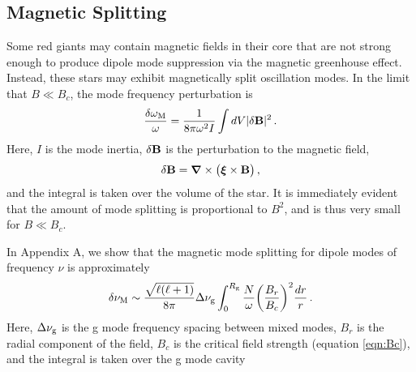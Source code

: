\subsection{Magnetic Splitting}

Some red giants may contain magnetic fields in their core that are not strong enough to produce dipole mode suppression via the magnetic greenhouse effect. Instead, these stars may exhibit magnetically split oscillation modes. In the limit that $B \ll B_c$, the mode frequency perturbation is \citep{Unno_1989}
\begin{equation}
\label{eqn:dommag}
\frac{\delta \omega_{\rm M}}{\omega} = \frac{1}{8 \pi \omega^2 I} \int d V | \delta {\bf B} |^2 \, .
\end{equation}
Here, $I$ is the mode inertia,  $\delta {\bf B}$ is the perturbation to the magnetic field,
\begin{equation}
\label{eqn:dB}
\delta {\bf B} = {\boldsymbol \nabla} \times \big( {\boldsymbol \xi} \times {\bf B} \big) \, ,
\end{equation}
and the integral is taken over the volume of the star. It is immediately evident that the amount of mode splitting is proportional to $B^2$, and is thus very small for $B \ll B_c$.

In Appendix A, we show that the magnetic mode splitting for dipole modes of frequency $\nu$ is approximately
\begin{equation}
\label{eqn:dfmag}
\delta \nu_{\rm M} \sim \frac{\sqrt{\ell(\ell+1)}}{8 \pi} \Delta \nu_{\rm g} \int^{R_{\rm g}}_0 \frac{N}{\omega} \bigg(\frac{B_r}{B_c}\bigg)^2 \frac{dr}{r} \, .
\end{equation}
Here, $\Delta \nu_{\rm g}$ is the g mode frequency spacing between mixed modes, $B_r$ is the radial component of the field, $B_c$ is the critical field strength (equation \ref{eqn:Bc}), and the integral is taken over the g mode cavity

